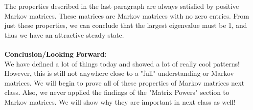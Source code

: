\documentclass[12pt]{amsart}
\begin{document}
The properties described in the last paragraph are always satisfied by positive Markov matrices. These matrices are Markov matrices with no zero entries. From just these properties, we can conclude that the largest eigenvalue must be 1, and thus we have an attractive steady state.\\
\\
\textbf{Conclusion/Looking Forward:}\\
We have defined a lot of things today and showed a lot of really cool patterns! However, this is still not anywhere close to a "full" understanding or Markov matrices. We will begin to prove all of these properties of Markov matrices next class. Also, we never applied the findings of the "Matrix Powers" section to Markov matrices. We will show why they are important in next class as well!
 
\end{document}

